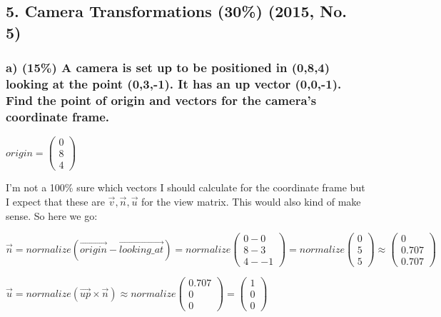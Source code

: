 \subsection{5.  Camera Transformations (30\%) (2015, No. 5)} 
\subsubsection{a)  (15\%) A camera is set up to be positioned in (0,8,4) looking at the point (0,3,-1). It has an up vector (0,0,-1). Find the point of origin and vectors for the camera's coordinate frame.}

$
    origin
=
    \left(\begin{array}{c}
        0\\
        8\\
        4
    \end{array}\right)
$

I'm not a 100\% sure which vectors I should calculate for the coordinate frame but I expect that these are $ \vec{v}, \vec{n}, \vec{u} $ for the view matrix. This would also kind of make sense. So here we go:

$ 
    \vec{n}
=
    normalize(\vec{origin} - \vec{looking\_at})
=
    normalize\left(\begin{array}{c}
        0 - 0 \\
        8 - 3 \\
        4 - -1
    \end{array}\right) 
= 
    normalize\left(\begin{array}{c}
        0 \\
        5 \\
        5
    \end{array}\right)
\approx
    \left(\begin{array}{c}
        0\\
        0.707\\
        0.707
    \end{array}\right)
$

$
    \vec{u}
=
    normalize\left( \vec{up} \times \vec{n} \right)
\approx
    normalize\left(\begin{array}{c}
        0.707\\
        0\\
        0
    \end{array}\right)
=
    \left(\begin{array}{c}
        1\\
        0\\
        0
    \end{array}\right)
$

